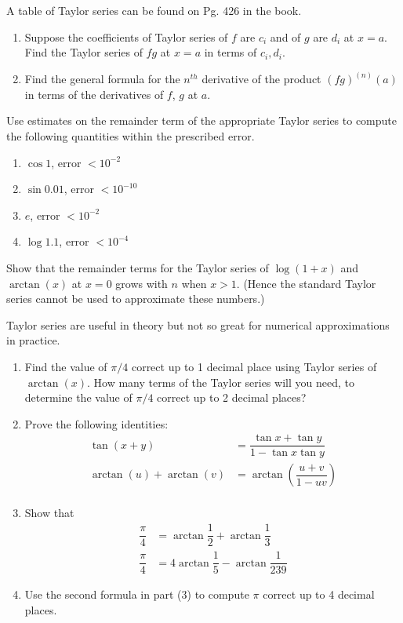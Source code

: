 \documentclass[9pt, a4paper, oneside, reqno]{amsart}
\begin{document}
A table of Taylor series can be found on Pg. 426 in the book.
\begin{questions}[resume]
	\item
	\begin{enumerate}
		\item Suppose the coefficients of Taylor series of $ f$ are $ c_i$ and of $ g$ are $ d_i$ at $ x=a$. Find the Taylor series of $ fg$ at $ x=a$ in terms of $ c_i, d_i$.
		\item Find the general formula for the $ n^{th}$ derivative of the product ${ (fg)^{(n)}}(a) $ in terms of the derivatives of $ f$, $ g$ at $ a$.
	\end{enumerate}

	\item Use estimates on the remainder term of the appropriate Taylor series to compute the following quantities within the prescribed error.
	\begin{multicols}{2}
		\begin{enumerate}
			\item $ \cos 1$, error $ < 10^{-2}$
			\item $ \sin 0.01$, error $ < 10^{-10}$
			\item $ e$, error $ < 10^{-2}$
			\item $ \log 1.1$, error $ < 10^{-4}$
		\end{enumerate}
	\end{multicols}

	\item Show that the remainder terms for the Taylor series of $ \log(1+x)$ and $ \arctan(x)$ at $ x=0$ grows with $ n$ when $ x > 1$. (Hence the standard Taylor series cannot be used to approximate these numbers.)

	\item Taylor series are useful in theory but not so great for numerical approximations in practice.
	\begin{enumerate}
		\item Find the value of $ \pi/4$ correct up to 1 decimal place using Taylor series of $ \arctan(x)$. How many terms of the Taylor series will you need, to determine the value of $ \pi/4$ correct up to 2 decimal places?

		\item Prove the following identities:
		      \begin{align*}
		      	\tan(x+y)               & = \dfrac{\tan x + \tan y}{1 - \tan x \tan y}    \\
		      	\arctan(u) + \arctan(v) & = \arctan \left( \dfrac{u + v}{1 - u v} \right) \\
		      \end{align*}
		\item Show that
		      \begin{align*}
		      	\dfrac{\pi}{4} & = \arctan \dfrac{1}{2} + \arctan \dfrac{1}{3}    \\
		      	\dfrac{\pi}{4} & = 4\arctan \dfrac{1}{5} - \arctan \dfrac{1}{239}
		      \end{align*}
		\item Use the second formula in part (3) to compute $ \pi$ correct up to 4 decimal places.
	\end{enumerate}


\end{questions}
\end{document}
